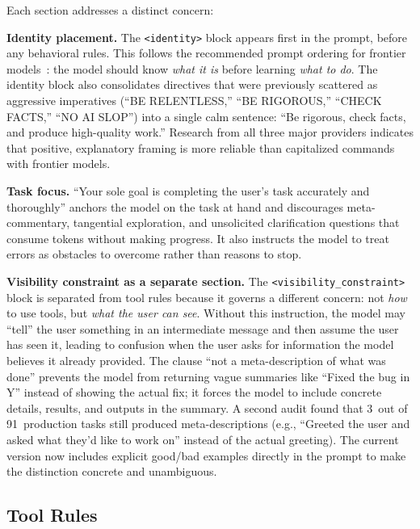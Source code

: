 \documentclass{article}
\begin{document}
\noindent Each section addresses a distinct concern:

\textbf{Identity placement.}  The \texttt{<identity>} block appears first in the prompt, before any behavioral rules.  This follows the recommended prompt ordering for frontier models~\citep{anthropic2025prompting,openai2025prompting}: the model should know \emph{what it is} before learning \emph{what to do}.  The identity block also consolidates directives that were previously scattered as aggressive imperatives (``BE RELENTLESS,'' ``BE RIGOROUS,'' ``CHECK FACTS,'' ``NO AI SLOP'') into a single calm sentence: ``Be rigorous, check facts, and produce high-quality work.''  Research from all three major providers indicates that positive, explanatory framing is more reliable than capitalized commands with frontier models.

\textbf{Task focus.}  ``Your sole goal is completing the user's task accurately and thoroughly'' anchors the model on the task at hand and discourages meta-commentary, tangential exploration, and unsolicited clarification questions that consume tokens without making progress.  It also instructs the model to treat errors as obstacles to overcome rather than reasons to stop.

\textbf{Visibility constraint as a separate section.}  The \texttt{<visibility\_constraint>} block is separated from tool rules because it governs a different concern: not \emph{how} to use tools, but \emph{what the user can see}.  Without this instruction, the model may ``tell'' the user something in an intermediate message and then assume the user has seen it, leading to confusion when the user asks for information the model believes it already provided.  The clause ``not a meta-description of what was done'' prevents the model from returning vague summaries like ``Fixed the bug in Y'' instead of showing the actual fix; it forces the model to include concrete details, results, and outputs in the summary.  A second audit found that 3~out of 91~production tasks still produced meta-descriptions (e.g., ``Greeted the user and asked what they'd like to work on'' instead of the actual greeting).  The current version now includes explicit good/bad examples directly in the prompt to make the distinction concrete and unambiguous.

\subsection{Tool Rules}
\end{document}
